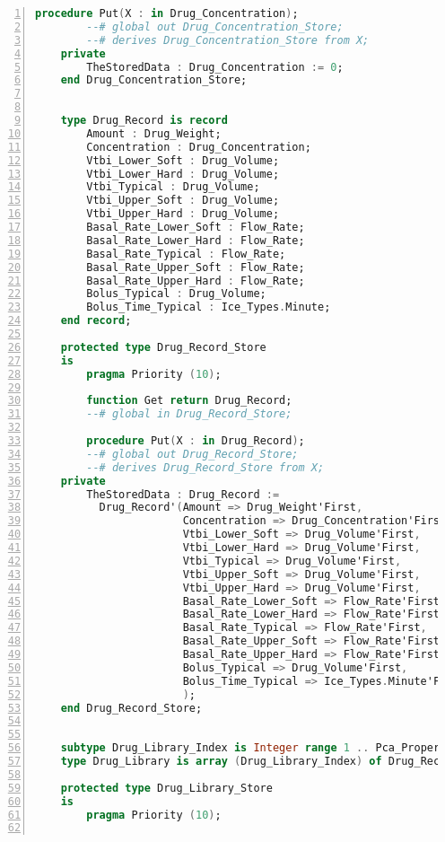 \begin{lstlisting}[language=ada, gobble=0, numbers=left, caption={\lstinline{Pca_Types} package}, label={listing:pca_generated:pca_types}]
        procedure Put(X : in Drug_Concentration);
        --# global out Drug_Concentration_Store;
        --# derives Drug_Concentration_Store from X;
    private
        TheStoredData : Drug_Concentration := 0;
    end Drug_Concentration_Store;


    type Drug_Record is record
        Amount : Drug_Weight;
        Concentration : Drug_Concentration;
        Vtbi_Lower_Soft : Drug_Volume;
        Vtbi_Lower_Hard : Drug_Volume;
        Vtbi_Typical : Drug_Volume;
        Vtbi_Upper_Soft : Drug_Volume;
        Vtbi_Upper_Hard : Drug_Volume;
        Basal_Rate_Lower_Soft : Flow_Rate;
        Basal_Rate_Lower_Hard : Flow_Rate;
        Basal_Rate_Typical : Flow_Rate;
        Basal_Rate_Upper_Soft : Flow_Rate;
        Basal_Rate_Upper_Hard : Flow_Rate;
        Bolus_Typical : Drug_Volume;
        Bolus_Time_Typical : Ice_Types.Minute;
    end record;

    protected type Drug_Record_Store
    is
        pragma Priority (10);

        function Get return Drug_Record;
        --# global in Drug_Record_Store;

        procedure Put(X : in Drug_Record);
        --# global out Drug_Record_Store;
        --# derives Drug_Record_Store from X;
    private
        TheStoredData : Drug_Record :=
          Drug_Record'(Amount => Drug_Weight'First,
                       Concentration => Drug_Concentration'First,
                       Vtbi_Lower_Soft => Drug_Volume'First,
                       Vtbi_Lower_Hard => Drug_Volume'First,
                       Vtbi_Typical => Drug_Volume'First,
                       Vtbi_Upper_Soft => Drug_Volume'First,
                       Vtbi_Upper_Hard => Drug_Volume'First,
                       Basal_Rate_Lower_Soft => Flow_Rate'First,
                       Basal_Rate_Lower_Hard => Flow_Rate'First,
                       Basal_Rate_Typical => Flow_Rate'First,
                       Basal_Rate_Upper_Soft => Flow_Rate'First,
                       Basal_Rate_Upper_Hard => Flow_Rate'First,
                       Bolus_Typical => Drug_Volume'First,
                       Bolus_Time_Typical => Ice_Types.Minute'First
                       );
    end Drug_Record_Store;


    subtype Drug_Library_Index is Integer range 1 .. Pca_Properties.Drug_Library_Size;
    type Drug_Library is array (Drug_Library_Index) of Drug_Record;

    protected type Drug_Library_Store
    is
        pragma Priority (10);


\end{lstlisting}
